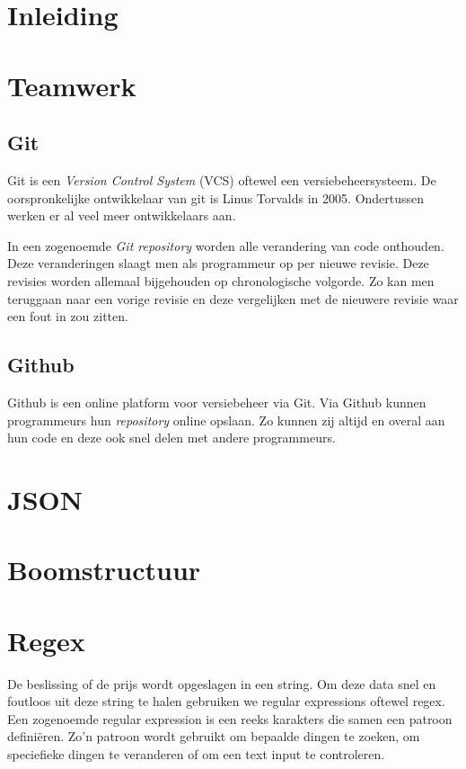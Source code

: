 \section{Inleiding}

\section{Teamwerk}
\subsection{Git}
Git is een \textit{Version Control System} (VCS) oftewel een versiebeheersysteem. De oorspronkelijke ontwikkelaar van git is Linus Torvalds in 2005.\cite{init_git} Ondertussen werken er al veel meer ontwikkelaars aan. 

In een zogenoemde \textit{Git repository} worden alle verandering van code onthouden. Deze veranderingen slaagt men als programmeur op per nieuwe revisie. Deze revisies worden allemaal bijgehouden op chronologische volgorde. Zo kan men teruggaan naar een vorige revisie en deze vergelijken met de nieuwere revisie waar een fout in zou zitten.
\subsection{Github}
Github is een online platform voor versiebeheer via Git. Via Github kunnen programmeurs hun \textit{repository} online opslaan. Zo kunnen zij altijd en overal aan hun code en deze ook snel delen met andere programmeurs.

\section{JSON}



\section{Boomstructuur}
\section{Regex}
De beslissing of de prijs wordt opgeslagen in een string. Om deze data snel en foutloos uit deze string te halen gebruiken we regular expressions oftewel regex. Een zogenoemde regular expression is een reeks karakters die samen een patroon definiëren. Zo'n patroon wordt gebruikt om bepaalde dingen te zoeken, om speciefieke dingen te veranderen of om een text input te controleren. \cite{wiki:regex}

